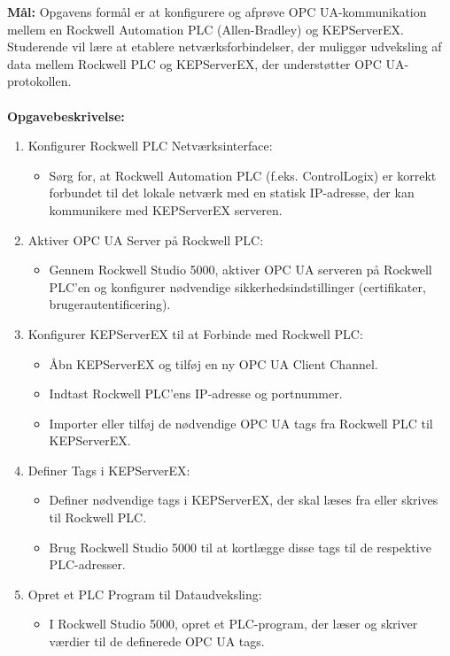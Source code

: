 \textbf{Mål:} Opgavens formål er at konfigurere og afprøve OPC UA-kommunikation mellem en Rockwell Automation PLC (Allen-Bradley) og KEPServerEX. Studerende vil lære at etablere netværksforbindelser, der muliggør udveksling af data mellem Rockwell PLC og KEPServerEX, der understøtter OPC UA-protokollen.
\\\\
\noindent\textbf{Opgavebeskrivelse:}
\begin{enumerate}
	\item Konfigurer Rockwell PLC Netværksinterface:
	\begin{itemize}
		\item Sørg for, at Rockwell Automation PLC (f.eks. ControlLogix) er korrekt forbundet til det lokale netværk med en statisk IP-adresse, der kan kommunikere med KEPServerEX serveren.
	\end{itemize}
	\item Aktiver OPC UA Server på Rockwell PLC:
	\begin{itemize}
		\item Gennem Rockwell Studio 5000, aktiver OPC UA serveren på Rockwell PLC'en og konfigurer nødvendige sikkerhedsindstillinger (certifikater, brugerautentificering).
	\end{itemize}
	\item Konfigurer KEPServerEX til at Forbinde med Rockwell PLC:
	\begin{itemize}
		\item Åbn KEPServerEX og tilføj en ny OPC UA Client Channel.
		\item Indtast Rockwell PLC’ens IP-adresse og portnummer.
		\item Importer eller tilføj de nødvendige OPC UA tags fra Rockwell PLC til KEPServerEX.
	\end{itemize}
	\item Definer Tags i KEPServerEX:
	\begin{itemize}
		\item Definer nødvendige tags i KEPServerEX, der skal læses fra eller skrives til Rockwell PLC.
		\item Brug Rockwell Studio 5000 til at kortlægge disse tags til de respektive PLC-adresser.
	\end{itemize}
	\item Opret et PLC Program til Dataudveksling:
	\begin{itemize}
		\item I Rockwell Studio 5000, opret et PLC-program, der læser og skriver værdier til de definerede OPC UA tags.

\end{itemize}
\end{enumerate}
